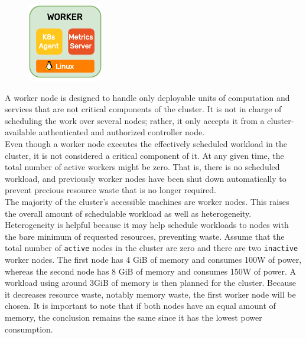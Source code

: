 \begin{figure}
  \centering
  \includegraphics[width=\linewidth]{images/architecture/worker.pdf}
\end{figure}

A worker node is designed to handle only deployable units of computation and
services that are not critical components of the cluster. It is not in charge of
scheduling the work over several nodes; rather, it only accepts it from a cluster-available
authenticated and authorized controller node. \\ %
Even though a worker node executes the effectively scheduled workload in the cluster,
it is not considered a critical component of it. At any given time, the total
number of active workers might be zero. That is, there is no scheduled workload,
and previously worker nodes have been shut down automatically to prevent precious
resource waste that is no longer required. \\ %
The majority of the cluster's accessible machines are worker nodes. This raises
the overall amount of schedulable workload as well as heterogeneity. Heterogeneity
is helpful because it may help schedule workloads to nodes with the bare minimum
of requested resources, preventing waste. Assume that the total number of \texttt{active}
nodes in the cluster are zero and there are two \texttt{inactive} worker nodes.
The first node has 4 GiB of memory and consumes 100W of power, whereas the second
node has 8 GiB of memory and consumes 150W of power. A workload using around
3GiB of memory is then planned for the cluster. Because it decreases resource waste,
notably memory waste, the first worker node will be chosen. It is important to
note that if both nodes have an equal amount of memory, the conclusion remains the
same since it has the lowest power consumption.

